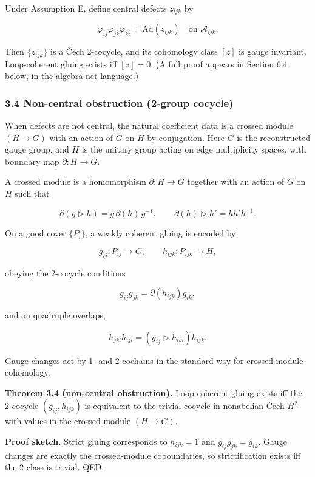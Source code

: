 Under Assumption E, define central defects \(z_{ijk}\) by

\[
\varphi_{ij} \varphi_{jk} \varphi_{ki} = \mathrm{Ad}(z_{ijk}) \quad \text{on } \mathcal{A}_{ijk}.
\]

Then \(\{z_{ijk}\}\) is a \v{C}ech 2-cocycle, and its cohomology class \([z]\) is gauge invariant. Loop-coherent gluing exists iff \([z] = 0\). (A full proof appears in Section 6.4 below, in the algebra-net language.)

\subsubsection{3.4 Non-central obstruction (2-group cocycle)}\label{34-non-central-obstruction-2-group-cocycle}

When defects are not central, the natural coefficient data is a crossed module \((H \to G)\) with an action of \(G\) on \(H\) by conjugation. Here \(G\) is the reconstructed gauge group, and \(H\) is the unitary group acting on edge multiplicity spaces, with boundary map \(\partial: H \to G\).

A crossed module is a homomorphism \(\partial: H \to G\) together with an action of \(G\) on \(H\) such that

\[
\partial(g \triangleright h) = g\,\partial(h)\,g^{-1},
\qquad
\partial(h) \triangleright h' = h h' h^{-1}.
\]

On a good cover \(\{P_i\}\), a weakly coherent gluing is encoded by:

\[
g_{ij}: P_{ij} \to G,\qquad h_{ijk}: P_{ijk} \to H,
\]

obeying the 2-cocycle conditions

\[
g_{ij} g_{jk} = \partial(h_{ijk}) g_{ik},
\]

and on quadruple overlaps,

\[
h_{jkl} h_{ijl} = (g_{ij} \triangleright h_{ikl}) h_{ijk}.
\]

Gauge changes act by 1- and 2-cochains in the standard way for crossed-module cohomology.

\textbf{Theorem 3.4 (non-central obstruction).} Loop-coherent gluing exists iff the 2-cocycle \((g_{ij}, h_{ijk})\) is equivalent to the trivial cocycle in nonabelian \v{C}ech \(H^2\) with values in the crossed module \((H \to G)\).

\textbf{Proof sketch.} Strict gluing corresponds to \(h_{ijk}=1\) and \(g_{ij}g_{jk}=g_{ik}\). Gauge changes are exactly the crossed-module coboundaries, so strictification exists iff the 2-class is trivial. QED.

